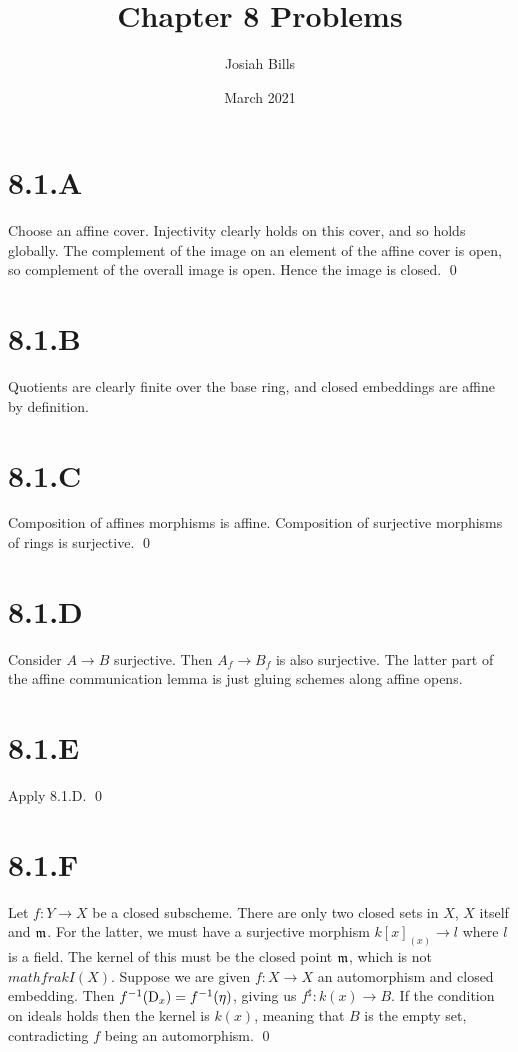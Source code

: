 \documentclass{article}
\title{Chapter 8 Problems}
\author{Josiah Bills}
\date{March 2021}
\begin{document}
\maketitle

\section{8.1.A}
Choose an affine cover. Injectivity clearly holds on this cover, and so holds
globally. The complement of the image on an element of the affine cover is
open, so complement of the overall image is open. Hence the image is closed.
\qed

\section{8.1.B}
Quotients are clearly finite over the base ring, and closed embeddings are
affine by definition.

\section{8.1.C}
Composition of affines morphisms is affine. Composition of surjective morphisms
of rings is surjective. \qed

\section{8.1.D}
Consider $A \to B$ surjective. Then $A_f \to B_f$ is also
surjective. The latter part of the affine communication lemma is just gluing
schemes along affine opens.

\section{8.1.E}
Apply 8.1.D. \qed

\section{8.1.F}
Let $f: Y \to X$ be a closed subscheme. There are only two closed
sets in $X$, $X$ itself and
${\mathfrak{m}}$. For the latter, we must have a surjective morphism
$k[x]_{(x)} \to l$ where $l$ is a field. The kernel of
this must be the closed point $\mathfrak{m}$, which is not
$mathfrak{I}(X)$. Suppose we are given $f: X \to X$ an
automorphism and closed embedding. Then $f^{-1}(\operatorname{D}_x)=f^{-1}({\eta})$, giving us
$f^{\sharp}: k(x) \to B$. If the condition on ideals holds then the kernel is
$k(x)$, meaning that $B$ is the empty set,
contradicting $f$ being an automorphism. \qed
\end{document}
